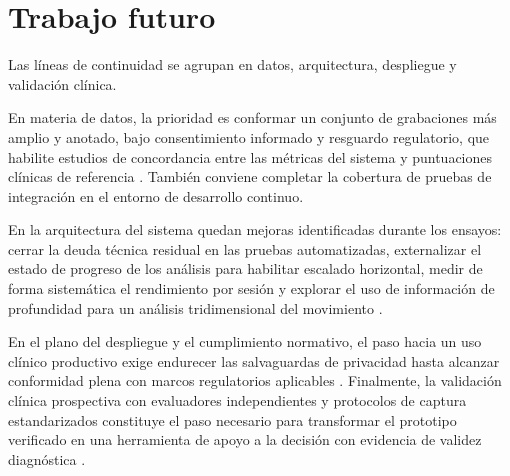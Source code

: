 
\section{Trabajo futuro}
\label{sec:trabajo-futuro}

Las líneas de continuidad se agrupan en datos, arquitectura, despliegue y validación clínica.

En materia de datos, la prioridad es conformar un conjunto de grabaciones más amplio y anotado, bajo consentimiento informado y resguardo regulatorio, que habilite estudios de concordancia entre las métricas del sistema y puntuaciones clínicas de referencia \citep{sibley2021video}. También conviene completar la cobertura de pruebas de integración en el entorno de desarrollo continuo.

En la arquitectura del sistema quedan mejoras identificadas durante los ensayos: cerrar la deuda técnica residual en las pruebas automatizadas, externalizar el estado de progreso de los análisis para habilitar escalado horizontal, medir de forma sistemática el rendimiento por sesión y explorar el uso de información de profundidad para un análisis tridimensional del movimiento \citep{guarin2025postural}.

En el plano del despliegue y el cumplimiento normativo, el paso hacia un uso clínico productivo exige endurecer las salvaguardas de privacidad hasta alcanzar conformidad plena con marcos regulatorios aplicables \citep{hipaa1996}. Finalmente, la validación clínica prospectiva con evaluadores independientes y protocolos de captura estandarizados constituye el paso necesario para transformar el prototipo verificado en una herramienta de apoyo a la decisión con evidencia de validez diagnóstica \citep{pecoraro2025computer}.
